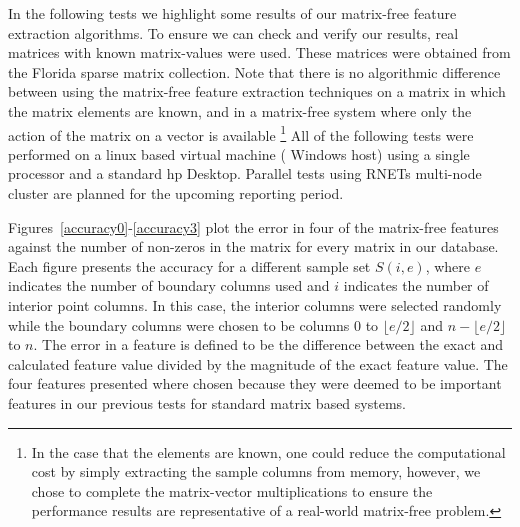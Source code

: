 In the following tests we highlight some results of our matrix-free feature extraction algorithms. To ensure we can check and verify our results, real matrices with known matrix-values were used. These matrices were obtained from the Florida sparse matrix collection. Note that there is no algorithmic difference between using the matrix-free feature extraction techniques on a matrix in which the matrix elements are known, and in a matrix-free system where only the action of the matrix on a vector is available \footnote{ In the case that the elements are known, one could reduce the computational cost by simply extracting the sample columns from memory, however, we chose to complete the matrix-vector multiplications to ensure the performance results are representative of a real-world matrix-free problem.} All of the following tests were performed on a linux based virtual machine ( Windows host) using a single processor and a standard hp Desktop. Parallel tests using RNETs multi-node cluster are planned for the upcoming reporting period.  

Figures~\ref{accuracy0}-\ref{accuracy3} plot the error in four of the matrix-free features against the number of non-zeros in the matrix for every matrix in our database. Each figure presents the accuracy for a different sample set $S(i,e)$, where $e$ indicates the number of boundary columns used  and $i$ indicates the number of interior point columns. In this case, the interior columns were selected randomly while the boundary columns were chosen to be columns $0$ to $\lfloor e/2 \rfloor $ and $n-\lfloor e/2 \rfloor $ to $n$. The error in a feature is defined to be the difference between the exact and calculated feature value divided by the magnitude of the exact feature value. The four features presented where chosen because they were deemed to be important features in our previous tests for standard matrix based systems. 

